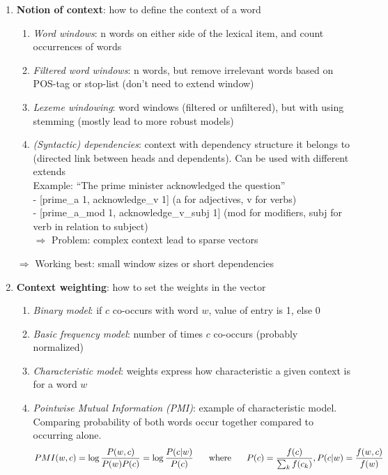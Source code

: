 \begin{enumerate}
	\item \textbf{Notion of context}: how to define the context of a word
	\begin{enumerate}
		\item \textit{Word windows}: n words on either side of the lexical item, and count occurrences of words
		\item \textit{Filtered word windows}: n words, but remove irrelevant words based on POS-tag or stop-list (don't need to extend window)
		\item \textit{Lexeme windowing}: word windows (filtered or unfiltered), but with using stemming (mostly lead to more robust models)
		\item \textit{(Syntactic) dependencies}: context with dependency structure it belongs to (directed link between heads and dependents). Can be used with different extends\\
		Example: ``The prime minister acknowledged the question'' \\
		- [prime\_a 1, acknowledge\_v 1] (a for adjectives, v for verbs)\\
		- [prime\_a\_mod 1, acknowledge\_v\_subj 1] (mod for modifiers, subj for verb in relation to subject)\\
		$\Rightarrow$ Problem: complex context lead to sparse vectors
	\end{enumerate}
	$\Rightarrow$ Working best: small window sizes or short dependencies
	\item \textbf{Context weighting}: how to set the weights in the vector
	\begin{enumerate}
		\item \textit{Binary model}: if $c$ co-occurs with word $w$, value of entry is 1, else 0
		\item \textit{Basic frequency model}: number of times $c$ co-occurs (probably normalized)
		\item \textit{Characteristic model}: weights express how characteristic a given context is for a word $w$\\
		\item \textit{Pointwise Mutual Information (PMI)}: example of characteristic model. Comparing probability of both words occur together compared to occurring alone.\\
		$$PMI(w,c)=\log \frac{P(w,c)}{P(w)P(c)} = \log \frac{P(c|w)}{P(c)} \text{\hspace{5mm} where \hspace{5mm}}P(c) = \frac{f(c)}{\sum_k f(c_k)}, P(c|w) = \frac{f(w,c)}{f(w)}$$

\end{enumerate}
\end{enumerate}
